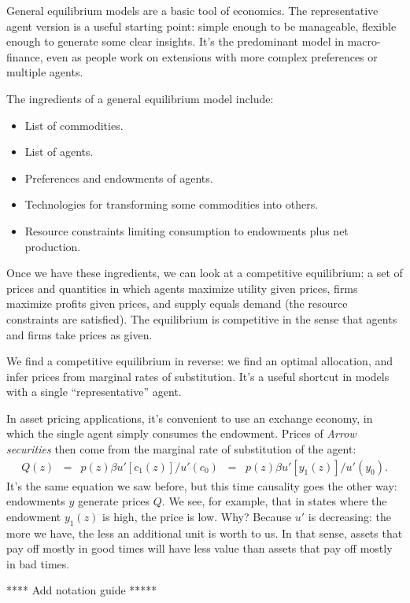 \documentclass[11pt]{article}
\begin{document}
General equilibrium models are a basic tool of economics.
The representative agent version is a useful starting point:
simple enough to be manageable, flexible enough to generate some clear insights.
It's the predominant model in macro-finance,
even as people work on extensions with more complex preferences
or multiple agents.

The ingredients of a general equilibrium model include:
\begin{itemize}
\item List of commodities.
\item List of agents.
\item Preferences and endowments of agents.
\item Technologies for transforming some commodities into others.
\item Resource constraints limiting consumption to endowments plus net production.
\end{itemize}
Once we have these ingredients, we can
look at a competitive equilibrium:
a set of prices and quantities in which
agents maximize utility given prices,
firms maximize profits given prices,
and supply equals demand (the resource constraints are satisfied).
The equilibrium is competitive in the sense that agents and firms
take prices as given.

We find a competitive equilibrium in reverse:
we find an optimal allocation, and infer prices from
marginal rates of substitution.
It's a useful shortcut in models with a single ``representative'' agent.

In asset pricing applications, it's convenient
to use an exchange economy, in which the single agent simply consumes
the endowment.
Prices of {\it Arrow securities\/} then come from the marginal rate of substitution
of the agent:
\begin{eqnarray*}
    Q(z) &=& p(z) \beta u'[c_1(z)]/u'(c_0) \;\;=\;\; p(z) \beta u'[y_1(z)]/u'(y_0) .
\end{eqnarray*}
It's the same equation we saw before, but this time causality goes the
other way:  endowments $y$ generate prices $Q$.
We see, for example, that in states where the endowment $y_1(z)$ is high,
the price is low.
Why?  Because $u'$ is decreasing:  the more we have, the less an additional
unit is worth to us.
In that sense, assets that pay off mostly in good times will have less value
than assets that pay off mostly in bad times.



**** Add notation guide *****
\end{document}
